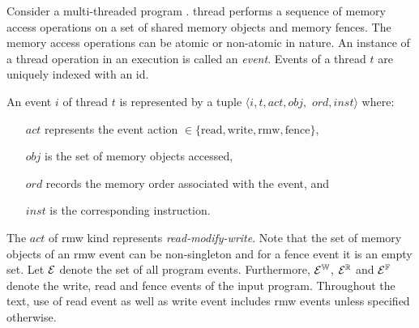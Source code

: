 Consider a multi-threaded \cc
program . 
  thread 
performs a sequence of memory access operations on a set of shared
memory objects and \cc memory fences.  The memory access operations
can be atomic or non-atomic in nature.
%
An instance of a thread operation in an execution is called an {\em
event}.  Events of a thread $t$ are uniquely indexed with an id.
%
\begin{definition}[Event]
An event $i$ of thread $t$ is represented by a tuple $\langle i, t, act, obj,$ $ ord, inst \rangle$ where:
\begin{itemize}[label=inst,align=left,leftmargin=*]
\item [$act$] represents the event action $\in \{\text{read}, \text{write}, \text{rmw}, \text{fence} \} $,
\item [$obj$] is the set of memory objects accessed,
\item [$ord$] records the \cc memory order associated with the event, and
\item [$inst$] is the corresponding   instruction.
\end{itemize}
\end{definition}
The $act$ of rmw kind represents {\em read-modify-write}.
%
Note that the set of memory objects of an rmw event can be non-singleton 
and for a fence event it is an empty set.
%
Let $\mathcal{E}$ denote the set of all program events. Furthermore,
$\mathcal{E}^{\mathbb{W}}$, $\mathcal{E}^{\mathbb{R}}$ and $\mathcal{E}^{\mathbb{F}}$ denote the write, read and fence 
events of the input program.
%
Throughout the text, use of read event as well as write event includes rmw
events unless specified otherwise.
%
